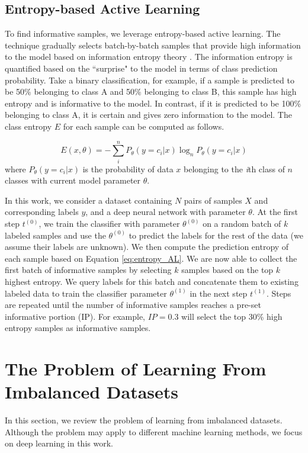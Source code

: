 \documentclass[journal]{IEEEtai}
\begin{document}
\subsection{Entropy-based Active Learning }   
\label{sec:EAL}
To find informative samples, we leverage entropy-based active learning. The technique gradually selects batch-by-batch samples that provide high information to the model based on information entropy theory \cite{shannon_mathematical_1948}. The information entropy is quantified based on the ``surprise" to the model in terms of class prediction probability. Take a binary classification, for example, if a sample is predicted to be 50\% belonging to class A and 50\% belonging to class B, this sample has high entropy and is informative to the model. In contrast, if it is predicted to be 100\% belonging to class A, it is certain and gives zero information to the model. The class entropy $E$ for each sample can be computed as follows. 

\begin{equation}
	E(x,\theta) = -\sum_i^n{ P_\theta( y=c_i|x) \log_n P_\theta(y=c_i|x) }
	\label{eq:entropy_AL}
\end{equation} 
where $P_\theta(y=c_i|x)$ is the probability of data $x$ belonging to the \textit{i}th class of $n$ classes with current model parameter $\theta$.

In this work, we consider a dataset containing $N$ pairs of samples $X$ and corresponding labels $y$, and a deep neural network with parameter $\theta$. At the first step $t^{(0)}$, we train the classifier with parameter $\theta^{(0)}$ on a random batch of $k$ labeled samples and use the $\theta^{(0)}$ to predict the labels for the rest of the data (we assume their labels are unknown). We then compute the prediction entropy of each sample based on Equation \ref{eq:entropy_AL}. We are now able to collect the first batch of informative samples by selecting $k$ samples based on the top $k$ highest entropy. We query labels for this batch and concatenate them to existing labeled data to train the classifier parameter $\theta^{(1)}$ in the next step $t^{(1)}$. Steps are repeated until the number of informative samples reaches a pre-set informative portion (IP). For example, $IP=0.3$ will select the top 30\% high entropy samples as informative samples.  

\section{The Problem of Learning From Imbalanced Datasets}
\label{sec:problem}
In this section, we review the problem of learning from imbalanced datasets. Although the problem may apply to different machine learning methods, we focus on deep learning in this work. 
\end{document}
